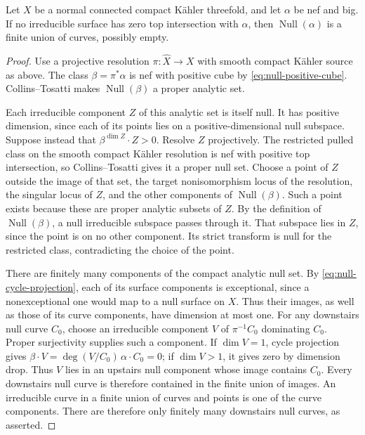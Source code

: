 \begin{lemma}\label{lem:no-null-surface}
Let \(X\) be a normal connected compact K\"ahler threefold, and let
\(\alpha\) be nef and big.  If no irreducible surface has zero top
intersection with \(\alpha\), then \(\operatorname{Null}(\alpha)\)
is a finite union of curves, possibly empty.
\end{lemma}
\begin{proof}
Use a projective resolution \(\pi:\widehat X\to X\) with smooth compact
K\"ahler source as above.  The class \(\beta=\pi^*\alpha\) is nef with
positive cube by \eqref{eq:null-positive-cube}.  Collins--Tosatti makes
\(\operatorname{Null}(\beta)\) a proper analytic set.

Each irreducible component \(Z\) of this analytic set is itself null.
It has positive dimension, since each of its points lies on a
positive-dimensional null subspace.
Suppose instead that \(\beta^{\dim Z}\cdot Z>0\).  Resolve \(Z\)
projectively.  The restricted pulled class on the smooth compact
K\"ahler resolution is nef with positive top intersection, so
Collins--Tosatti gives it a proper null set.  Choose a point of \(Z\)
outside the image of that set, the target nonisomorphism locus of the resolution,
the singular locus of \(Z\), and the other components of
\(\operatorname{Null}(\beta)\).  Such a point exists because these are
proper analytic subsets of \(Z\).  By the definition of
\(\operatorname{Null}(\beta)\), a null irreducible subspace passes through
it.  That subspace lies in \(Z\), since the point is on no other
component.  Its strict transform is null for the restricted class,
contradicting the choice of the point.

There are finitely many components of the compact analytic null set.
By \eqref{eq:null-cycle-projection}, each of its surface components is
exceptional, since a nonexceptional one would map to a null surface on
\(X\).  Thus their images, as well as those of its curve components,
have dimension at most one.  For any downstairs null curve \(C_0\),
choose an irreducible component \(V\) of \(\pi^{-1}C_0\) dominating
\(C_0\).  Proper surjectivity supplies such a component.  If
\(\dim V=1\), cycle projection gives
\(\beta\cdot V=\deg(V/C_0)\,\alpha\cdot C_0=0\); if \(\dim V>1\),
it gives zero by dimension drop.  Thus \(V\) lies in an upstairs null
component whose image contains \(C_0\).  Every downstairs null curve
is therefore contained in the finite union of images.  An irreducible
curve in a finite union of curves and
points is one of the curve components.  There are therefore only
finitely many downstairs null curves, as asserted.
\end{proof}
